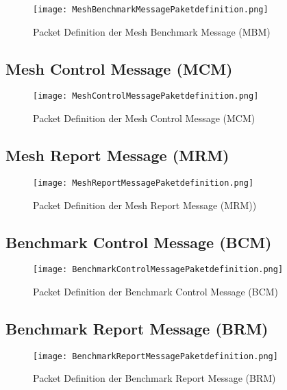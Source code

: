 
\begin{figure}[H]
	\centering
	\texttt{[image: MeshBenchmarkMessagePaketdefinition.png]}
	\caption{Packet Definition der Mesh Benchmark Message (MBM)}\label{fig:MeshBenchmarkMessagePaketdefinition}
\end{figure}


\subsection{Mesh Control Message (MCM)}\label{subsec:MeshControlMessage}



\begin{figure}[H]
	\centering
	\texttt{[image: MeshControlMessagePaketdefinition.png]}
	\caption{Packet Definition der Mesh Control Message (MCM)}\label{fig:MeshControlMessagePaketdefinition}
\end{figure}

\subsection{Mesh Report Message (MRM)}\label{subsec:MeshReportMessage}



\begin{figure}[H]
	\centering
	\texttt{[image: MeshReportMessagePaketdefinition.png]}
	\caption{Packet Definition der Mesh Report Message (MRM))}\label{fig:MeshReportMessagePaketdefinition}
\end{figure}

\subsection{Benchmark Control Message (BCM)}\label{subsec:BenchmarkControlMessage}


\begin{figure}[H]
	\centering
	\texttt{[image: BenchmarkControlMessagePaketdefinition.png]}
	\caption{Packet Definition der Benchmark Control Message (BCM)}\label{fig:BenchmarkControlMessagePaketdefinition}
\end{figure}

\subsection{Benchmark Report Message (BRM)}\label{subsec:BenchmarkReportMessage}


\begin{figure}[H]
	\centering
	\texttt{[image: BenchmarkReportMessagePaketdefinition.png]}
	\caption{Packet Definition der Benchmark Report Message (BRM)}\label{fig:BenchmarkReportMessagePaketdefinition}
\end{figure}


